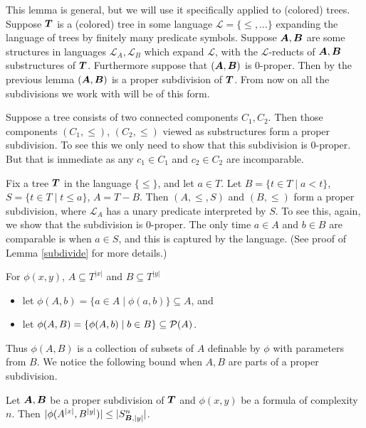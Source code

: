 \documentclass{amsart}
\DeclareMathOperator{\TT}{\boldface T}
\DeclareMathOperator{\AT}{\boldface A}
\DeclareMathOperator{\BT}{\boldface B}
\renewcommand{\LL}{\mathcal L}
\begin{document}
This lemma is general, but we will use it specifically applied to (colored) trees.
Suppose $\TT$ is a (colored) tree in some language $\LL = \{\leq, \ldots\}$ expanding the language of trees by finitely many predicate symbols.
Suppose $\AT, \BT$ are some structures in languages $\LL_A, \LL_B$ which expand $\LL$, with the $\LL$-reducts of $\AT, \BT$ substructures of $\TT$.
Furthermore suppose that $(\AT, \BT)$ is 0-proper.
Then by the previous lemma $(\AT, \BT)$ is a proper subdivision of $\TT$.
From now on all the subdivisions we work with will be of this form.

\begin{Example} \label{ex_disc}
  Suppose a tree consists of two connected components $C_1, C_2$.
  Then those components $(C_1, \leq)$, $(C_2, \leq)$ viewed as substructures form a proper subdivision.
  To see this we only need to show that this subdivision is 0-proper.
  But that is immediate as any $c_1 \in C_1$ and $c_2 \in C_2$ are incomparable.
\end{Example}

\begin{Example} \label{ex_cone}
  Fix a tree $\TT$ in the language $\{\leq\}$, and let $a \in T$. Let $B = \{t \in T \mid a < t\}$, $S = \{t \in T \mid t \leq a\}$, $A = T - B$. Then $(A, \leq, S)$ and $(B, \leq)$ form a proper subdivision, where $\LL_A$ has a unary predicate interpreted by $S$.
  To see this, again, we show that the subdivision is 0-proper.
  The only time $a \in A$ and $b \in B$ are comparable is when $a \in S$, and this is captured by the language.
  (See proof of Lemma \ref{subdivide} for more details.)
\end{Example}

\begin{Definition} For $\phi(x, y)$, $A \subseteq T^{|x|}$ and $B \subseteq T^{|y|}$
  \begin{itemize}
  \item let $\phi(A, b) = \{a \in A \mid \phi(a, b)\} \subseteq A$, and 
  \item let $\phi(A, B) = \{\phi(A, b) \mid b \in B\} \subseteq \mathcal P(A)$.	
  \end{itemize}
\end{Definition}
Thus $\phi(A, B)$ is a collection of subsets of $A$ definable by $\phi$ with parameters from $B$. We notice the following bound when $A, B$ are parts of a proper subdivision.

\begin{Corollary} \label{cor_type_count}
  Let $\AT, \BT$ be a proper subdivision of $\TT$ and $\phi(x,y)$ be a formula of complexity $n$. Then $|\phi(A^{|x|}, B^{|y|})| \leq |S^n_{\BT, |y|}|$.
\end{Corollary}
\end{document}
